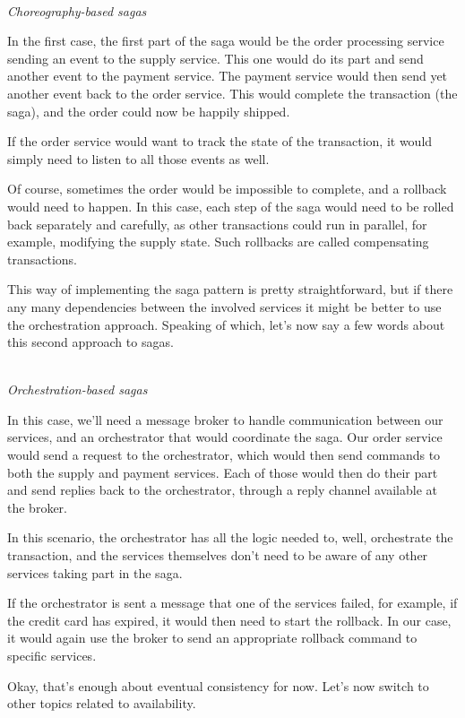 \hspace*{\fill} \\ %
\noindent
\textit{Choreography-based sagas}

In the first case, the first part of the saga would be the order processing service sending an event to the supply service. This one would do its part and send another event to the payment service. The payment service would then send yet another event back to the order service. This would complete the transaction (the saga), and the order could now be happily shipped.

If the order service would want to track the state of the transaction, it would simply need to listen to all those events as well.

Of course, sometimes the order would be impossible to complete, and a rollback would need to happen. In this case, each step of the saga would need to be rolled back separately and carefully, as other transactions could run in parallel, for example, modifying the supply state. Such rollbacks are called compensating transactions.

This way of implementing the saga pattern is pretty straightforward, but if there any many dependencies between the involved services it might be better to use the orchestration approach. Speaking of which, let's now say a few words about this second approach to sagas.

\hspace*{\fill} \\ %
\noindent
\textit{Orchestration-based sagas}

In this case, we'll need a message broker to handle communication between our services, and an orchestrator that would coordinate the saga. Our order service would send a request to the orchestrator, which would then send commands to both the supply and payment services. Each of those would then do their part and send replies back to the orchestrator, through a reply channel available at the broker. 

In this scenario, the orchestrator has all the logic needed to, well, orchestrate the transaction, and the services themselves don't need to be aware of any other services taking part in the saga.

If the orchestrator is sent a message that one of the services failed, for example, if the credit card has expired, it would then need to start the rollback. In our case, it would again use the broker to send an appropriate rollback command to specific services.

Okay, that's enough about eventual consistency for now. Let's now switch to other topics related to availability.




